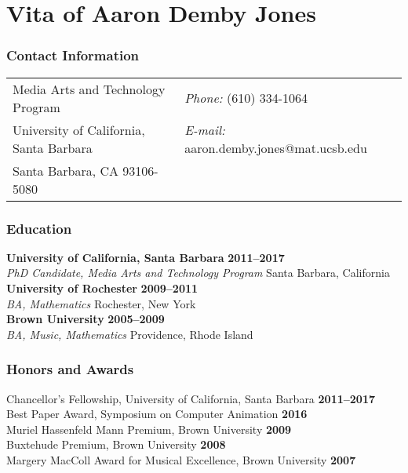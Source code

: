 {
\singlespace
\setlength{\parindent}{0em}
\setlength{\parskip}{1em}

\chapter*{Vita of Aaron Demby Jones}

\subsection*{Contact Information}
\vspace{.05in}
\begin{tabular}{@{}p{3.5in}p{4in}}
Media Arts and Technology Program & {\it Phone:}  (610) 334-1064\\             
University of California, Santa Barbara & {\it E-mail:} aaron.demby.jones@mat.ucsb.edu\\       
Santa Barbara, CA 93106-5080\\
\end{tabular}

\subsection*{Education}
  {\bf University of California, Santa Barbara} \hfill {\bf 2011--2017}\\
  {\em PhD Candidate, Media Arts and Technology Program} \hfill Santa Barbara,
  California\\[-3ex]

  {\bf University of Rochester}  \hfill {\bf 2009--2011}\\
  {\em BA, Mathematics} \hfill Rochester, New York\\[-3ex]
  
  {\bf Brown University}  \hfill {\bf 2005--2009}\\
  {\em BA, Music, Mathematics} \hfill Providence, Rhode Island\\[-3ex]

\subsection*{Honors and Awards} 
Chancellor's Fellowship, University of California, Santa Barbara \hfill {\bf 2011--2017}\\
Best Paper Award, Symposium on Computer Animation \hfill  {\bf 2016}\\
Muriel Hassenfeld Mann Premium, Brown University \hfill  {\bf 2009}\\
Buxtehude Premium, Brown University \hfill {\bf 2008}\\
Margery MacColl Award for Musical Excellence, Brown University  \hfill {\bf 2007}\\

}
